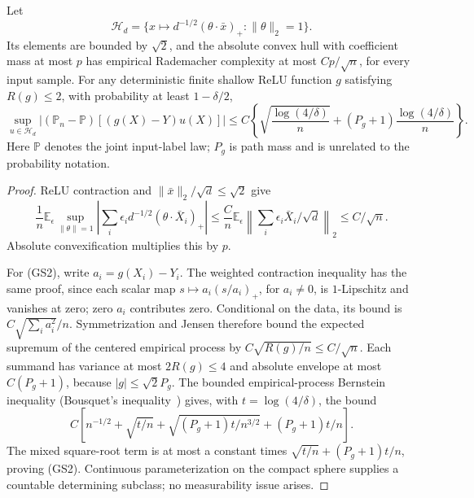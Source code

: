 \begin{lemma}
\label{lem:general-shallow-statistics}
Let
\[
 \mathcal H_d=\{x\mapsto d^{-1/2}(\theta\cdot\bar x)_+:
                              \|\theta\|_2=1\}.
\]
Its elements are bounded by $\sqrt2$, and the absolute convex hull
with coefficient mass at most $p$ has empirical Rademacher complexity
at most $Cp/\sqrt n$, for every input sample.
For any deterministic finite shallow ReLU function $g$ satisfying
$R(g)\le2$, with probability at least $1-\delta/2$,
\[
 \sup_{u\in\mathcal H_d}
 |(\mathbb P_n-\mathbb P)[(g(X)-Y)u(X)]|
 \le C\left\{\sqrt{\frac{\log(4/\delta)}n}
       +(P_g+1)\frac{\log(4/\delta)}n\right\}.              \tag{GS2}
\]
Here $\mathbb P$ denotes the joint input-label law; $P_g$ is path
mass and is unrelated to the probability notation.
\end{lemma}
\begin{proof}
ReLU contraction and $\|\bar x\|_2/\sqrt d\le\sqrt2$ give
\[
 \frac1n\mathbb E_\epsilon\sup_{\|\theta\|=1}
 \left|\sum_i\epsilon_i d^{-1/2}(\theta\cdot\bar X_i)_+\right|
 \le\frac Cn\mathbb E_\epsilon
           \left\|\sum_i\epsilon_i\bar X_i/\sqrt d\right\|_2
 \le C/\sqrt n.
\]
Absolute convexification multiplies this by $p$.

For (GS2), write $a_i=g(X_i)-Y_i$. The weighted contraction inequality
has the same proof, since each scalar map
$s\mapsto a_i(s/a_i)_+$, for $a_i\ne0$, is $1$-Lipschitz and vanishes
at zero; zero $a_i$ contributes zero. Conditional on the data, its
bound is $C\sqrt{\sum_i a_i^2}/n$. Symmetrization and Jensen therefore
bound the expected supremum of the centered empirical process by
$C\sqrt{R(g)/n}\le C/\sqrt n$.
Each summand has variance at most $2R(g)\le4$ and absolute envelope
at most $C(P_g+1)$, because $|g|\le\sqrt2P_g$.
The bounded empirical-process Bernstein inequality (Bousquet's
inequality~\cite{bousquet}) gives, with $t=\log(4/\delta)$, the bound
\[
 C\left[n^{-1/2}+\sqrt{t/n}
       +\sqrt{(P_g+1)t/n^{3/2}}+(P_g+1)t/n\right].
\]
The mixed square-root term is at most a constant times
$\sqrt{t/n}+(P_g+1)t/n$, proving (GS2).
Continuous parameterization on the compact sphere supplies a
countable determining subclass; no measurability issue arises.
\end{proof}

